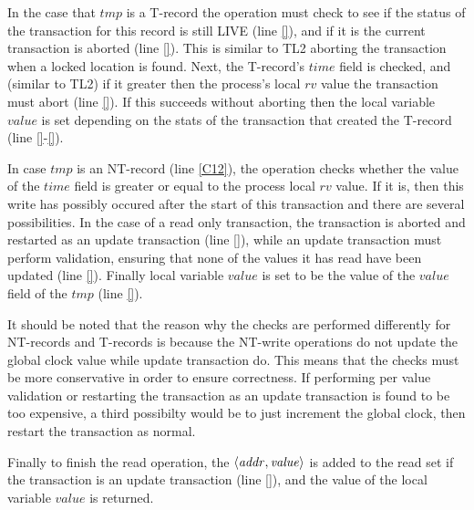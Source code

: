 \documentclass[11pt,letterpaper]{article}
\begin{document}
In the case that $\mathit{tmp}$ is a T-record the operation must check to see
if the status of the transaction for this record is still LIVE (line \ref{}), and if it is
the current transaction is aborted (line \ref{}).
This is similar to TL2 aborting the transaction when a locked location is found.
Next, the T-record's $\mathit{time}$ field is checked, and (similar to TL2) if it 
greater then the process's local $\mathit{rv}$ value the transaction must abort 
(line \ref{}).
If this succeeds without aborting then the local variable $\mathit{value}$
is set depending on the stats of the transaction that created the T-record (line \ref{}-\ref{}).


In case $\mathit{tmp}$ is an 
NT-record (line \ref{C12}), the operation
checks whether the value of the $\mathit{time}$ field is
greater or equal to the process local $\mathit{rv}$ value.
If it is, then this write has possibly occured after the start of this
transaction and there are several possibilities.
In the case of a read only transaction, the transaction
is aborted and restarted as an update transaction (line \ref{}),
while an update transaction must perform validation, ensuring
that none of the values it has read have been updated (line \ref{}).
Finally local variable $\mathit{value}$ is set to be the value
of the $\mathit{value}$ field of the $\mathit{tmp}$ (line \ref{}).

It should be noted that the reason why the checks are performed differently
for NT-records and T-records is because the NT-write operations do not
update the global clock value while update transaction do.
This means that the checks must be more conservative in order to ensure correctness.
If performing per value validation or restarting the transaction as an update transaction
is found to be too expensive, a third possibilty would be to just increment the global
clock, then restart the transaction as normal.


Finally to finish the read operation, the $\left \langle \mathit{addr, value} \right \rangle $
is added to the read set if the transaction is an update transaction (line \ref{}),
and the value of the local variable $\mathit{value}$  is returned.
\end{document}
